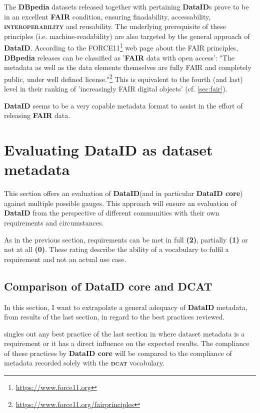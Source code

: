\documentclass[a4paper,english,twoside,BCOR1.5cm,headsepline,DIV12,appendixprefix,final,12pt]{scrbook}
\newcommand{\interoperability}{{\ttfamily\scshape\bfseries interoperability}\xspace}
\newcommand{\dataid}{{\ttfamily\bfseries DataID}\xspace}
\newcommand{\core}{{\ttfamily\bfseries DataID core}\xspace}
\newcommand{\dcat}{{\scshape\bfseries dcat}\xspace}
\newcommand{\dbpedia}{{\ttfamily\bfseries DBpedia}\xspace}
\newcommand\footnoteurl[1]{\footnote{\scriptsize\url{#1}}}
\begin{document}
The \dbpedia datasets released together with pertaining \dataid{}s prove to be in an excellent \textbf{FAIR} condition, ensuring finadability, accessability, \interoperability and reusability. The underlying prerequisite of these principles (i.e. machine-readability) are also targeted by the general approach of \dataid. According to the FORCE11\footnoteurl{https://www.force11.org} web page about the FAIR principles, \dbpedia releases can be classified as '\textbf{FAIR} data with open access': "The metadata as well as the data elements themselves are fully FAIR and completely public, under well defined license."\footnoteurl{https://www.force11.org/fairprinciples} This is equivalent to the fourth (and last) level in their ranking of 'increasingly FAIR digital objects' (cf. \cref{sec:fair}).


\dataid seems to be a very capable metadata format to assist in the effort of releasing \textbf{FAIR} data.


\pagebreak
\section{Evaluating DataID as dataset metadata} 
\label{sec:evaldataid}

This section offers an evaluation of \dataid (and in particular \core) against multiple possible gauges. This approach will ensure an evaluation of \dataid from the perspective of different communities with their own requirements and circumstances.

As in the previous section, requirements can be met in full \textbf{(2)}, partially \textbf{(1)} or not at all \textbf{(0)}. These rating describe the ability of a vocabulary to fulfil a requirement and not an actual use case.

\subsection{Comparison of DataID core and DCAT}
\label{sec:evaldataid}
In this section, I want to extrapolate a general adequacy of \dataid metadata, from results of the last section, in regard to the best practices reviewed.

 singles out any best practice of the last section in where dataset metadata is a requirement or it has a direct influence on the expected results. The  compliance of these practices by \core will be compared to the compliance of metadata recorded solely with the \dcat vocabulary. 
\end{document}
